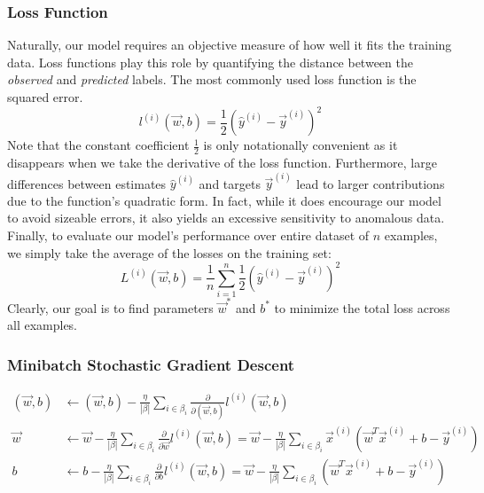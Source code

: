 \documentclass[a4paper,12pt]{article}
\theoremstyle{definition}
\begin{document}
    \subsubsection*{Loss Function}
    Naturally, our model requires an objective measure of how well it fits the training data.
    Loss functions play this role by quantifying the distance between the \textit{observed} and \textit{predicted}
    labels. The most commonly used loss function is the squared error.
    \begin{equation}
        l^{(i)}(\vec{w},b) = \frac{1}{2}(\hat{y}^{(i)}-\vec{y}^{(i)})^2
    \end{equation}
    Note that the constant coefficient $\frac{1}{2}$ is only notationally convenient as it disappears when we
    take the derivative of the loss function. Furthermore, large differences between estimates $\hat{y}^{(i)}$ 
    and targets $\vec{y}^{(i)}$ lead to larger contributions due to the function's quadratic form. In fact, while
    it does encourage our model to avoid sizeable errors, it also yields an excessive sensitivity to anomalous data.
    Finally, to evaluate our model's performance over entire dataset of $n$ examples, we simply take the average of 
    the losses on the training set:
    \begin{equation}
        L^{(i)}(\vec{w},b) = \frac{1}{n}\sum_{i=1}^{n}\frac{1}{2}(\hat{y}^{(i)}-\vec{y}^{(i)})^2
    \end{equation}
    Clearly, our goal is to find parameters $\vec{w}^*$ and $b^*$ to minimize the total loss across all examples.

    \subsubsection*{Minibatch Stochastic Gradient Descent}
    \begin{equation*}
        \begin{aligned}
        (\vec{w},b) &\leftarrow (\vec{w},b) - \frac{\eta}{|\beta|}\sum_{i\in\beta_i}\frac{\partial}{\partial(\vec{w},b)}l^{(i)}(\vec{w},b) \\
        \vec{w}     &\leftarrow \vec{w} - \frac{\eta}{|\beta|}\sum_{i\in\beta_i}\frac{\partial}{\partial\vec{w}}l^{(i)}(\vec{w},b) = \vec{w}- \frac{\eta}{|\beta|}\sum_{i\in\beta_i}\vec{x}^{(i)}(\vec{w}^T\vec{x}^{(i)} + b - \vec{y}^{(i)}) \\
        b           &\leftarrow b - \frac{\eta}{|\beta|}\sum_{i\in\beta_i}\frac{\partial}{\partial b}l^{(i)}(\vec{w},b) = \vec{w}- \frac{\eta}{|\beta|}\sum_{i\in\beta_i}(\vec{w}^T\vec{x}^{(i)} + b - \vec{y}^{(i)})
        \end{aligned}
    \end{equation*}
\end{document}
